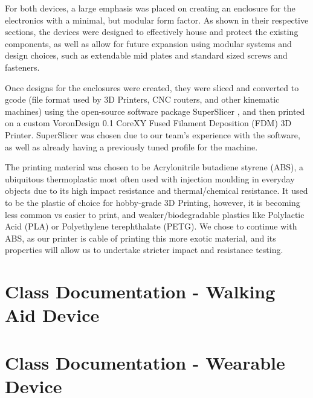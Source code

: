                    For both devices, a large emphasis was placed on creating an enclosure for the electronics with a minimal, but modular form factor. As shown in their respective sections, the devices were designed to effectively house and protect the existing components, as well as allow for future expansion using modular systems and design choices, such as extendable mid plates and standard sized screws and fasteners.
        
                    Once designs for the enclosures were created, they were sliced and converted to gcode (file format used by 3D Printers, CNC routers, and other kinematic machines) using the open-source software package SuperSlicer \cite{merill_2022}, and then printed on a custom VoronDesign 0.1 CoreXY Fused Filament Deposition (FDM) 3D Printer. SuperSlicer was chosen due to our team's experience with the software, as well as already having a previously tuned profile for the machine.
        
                    The printing material was chosen to be Acrylonitrile butadiene styrene (ABS), a ubiquitous thermoplastic most often used with injection moulding in everyday objects due to its high impact resistance and thermal/chemical resistance. It used to be the plastic of choice for hobby-grade 3D Printing, however, it is becoming less common vs easier to print, and weaker/biodegradable plastics like Polylactic Acid (PLA) or Polyethylene terephthalate (PETG). We chose to continue with ABS, as our printer is cable of printing this more exotic material, and its properties will allow us to undertake stricter impact and resistance testing.             
                
            \newpage
        
            \section{Class Documentation - Walking Aid Device}
            \label{sec:class_documentation_walk_aid}\mbox{}
        
                
                \newpage
                
                \newpage
                
                \newpage
                
                \newpage
                
                \newpage
                
                \newpage
        
            \section{Class Documentation - Wearable Device}
            \label{sec:class_documentation_wearable}\mbox{}
        
                
                \newpage
                
                \newpage
                
                \newpage
                
                \newpage